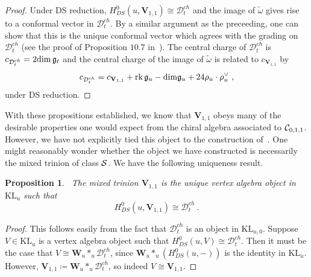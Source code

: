 \documentclass[a4paper]{article}
\newtheorem{prop}[thm]{Proposition}
\def\CC{{\cal C}}
\def\SS{{\cal S}}
\def\dim{{\rm dim}}
\def\gf{\mathfrak{g}}
\def \KL{\mathrm{KL}}
\def \rk{\mathrm{rk}}
\def\D{\mathcal{D}^{ch}}
\def\W{\mathbf{W}}
\def\V{\mathbf{V}}
\begin{document}
\begin{proof}
Under DS reduction, $H^0_{DS}(u,\V_{1,1})\cong \D_t$ and the image of $\widetilde{\omega}$ gives rise to a conformal vector in $\D_t$. By a similar argument as the preceeding, one can show that this is the unique conformal vector which agrees with the grading on $\D_t$ (see the proof of Proposition $10.7$ in~\cite{Arakawa:2018egx}). The central charge of $\D_t$ is $c_{\D_t}=2\dim\,\gf_t$ and the central charge of the image of $\widetilde{\omega}$ is related to $c_{\V_{1,1}}$ by
\begin{equation*}
	c_{\D_t} = c_{\V_{1,1}} +\rk\,\gf_u - \dim \gf_{u} +24 \rho_{u}\cdot\rho^\vee_{u} ~,
\end{equation*}
under DS reduction.
\end{proof}
\vspace{-6pt}

With these propositions established, we know that $\V_{1,1}$ obeys many of the desirable properties one would expect from the chiral algebra associated to $\CC_{0,1,1}$. However, we have not explicitly tied this object to the construction of~\cite{Beem:2013sza}. One might reasonably wonder whether the object we have constructed is necessarily the mixed trinion of class $\SS$. We have the following uniqueness result.
\begin{prop}~\label{prop:mixed_unique}
The mixed trinion $\V_{1,1}$ is the unique vertex algebra object in $\KL_u$ such that
\begin{equation*}
	H^0_{DS}(u,\V_{1,1})\cong \D_t~.
\end{equation*}
\end{prop}
\begin{proof}
This follows easily from the fact that $\D_t$ is an object in $\KL_{u,0}$. Suppose $V\in\KL_u$ is a vertex algebra object such that $H^0_{DS}(u,V)\cong \D_t$. Then it must be the case that $V \cong \W_u\ast_u \D_t $, since $\W_u\ast_u(H^0_{DS}(u,-))$ is the identity in $\KL_u$. However, $\V_{1,1}\coloneqq \W_u \ast_u \D_t$, so indeed $V\cong \V_{1,1}$.
\end{proof}
\vspace{-6pt}
\end{document}
